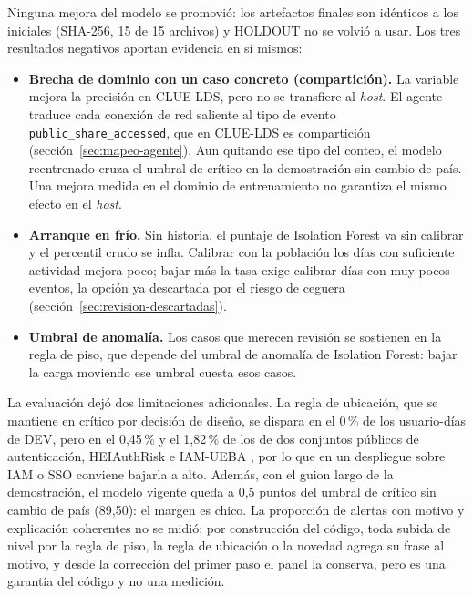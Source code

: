 Ninguna mejora del modelo se promovió: los artefactos finales son idénticos a los iniciales (SHA-256, 15 de 15 archivos) y HOLDOUT no se volvió a usar. Los tres resultados negativos aportan evidencia en sí mismos:
\begin{itemize}
	\item \textbf{Brecha de dominio con un caso concreto (compartición).} La variable mejora la precisión en CLUE-LDS, pero no se transfiere al \emph{host}. El agente traduce cada conexión de red saliente al tipo de evento \texttt{public\_\allowbreak{}share\_\allowbreak{}accessed}, que en CLUE-LDS es compartición (sección~\ref{sec:mapeo-agente}). Aun quitando ese tipo del conteo, el modelo reentrenado cruza el umbral de crítico en la demostración sin cambio de país. Una mejora medida en el dominio de entrenamiento no garantiza el mismo efecto en el \emph{host}.
	\item \textbf{Arranque en frío.} Sin historia, el puntaje de Isolation Forest va sin calibrar y el percentil crudo se infla. Calibrar con la población los días con suficiente actividad mejora poco; bajar más la tasa exige calibrar días con muy pocos eventos, la opción ya descartada por el riesgo de ceguera (sección~\ref{sec:revision-descartadas}).
	\item \textbf{Umbral de anomalía.} Los casos que merecen revisión se sostienen en la regla de piso, que depende del umbral de anomalía de Isolation Forest: bajar la carga moviendo ese umbral cuesta esos casos.
\end{itemize}

La evaluación dejó dos limitaciones adicionales. La regla de ubicación, que se mantiene en crítico por decisión de diseño, se dispara en el 0\,\% de los usuario-días de DEV, pero en el 0,45\,\% y el 1,82\,\% de los de dos conjuntos públicos de autenticación, HEIAuthRisk \parencite{Pena2026HEIAuthRisk} e IAM-UEBA \parencite{MayorGallego2026IAMUEBA}, por lo que en un despliegue sobre IAM o SSO conviene bajarla a alto. Además, con el guion largo de la demostración, el modelo vigente queda a 0,5 puntos del umbral de crítico sin cambio de país (89,50): el margen es chico. La proporción de alertas con motivo y explicación coherentes no se midió; por construcción del código, toda subida de nivel por la regla de piso, la regla de ubicación o la novedad agrega su frase al motivo, y desde la corrección del primer paso el panel la conserva, pero es una garantía del código y no una medición.

